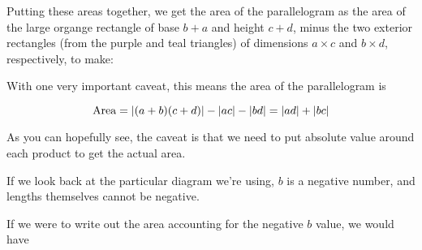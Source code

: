 \documentclass{ximera}
\begin{document}
\begin{example}
\begin{explanation}
      Putting these areas together, we get the area of the parallelogram as the area of the large organge rectangle of base $b+a$ and height $c+d$, minus the two exterior rectangles (from the purple and teal triangles) of dimensions $a\times c$ and $b\times d$, respectively, to make:

      \begin{center}
        \end{center}

      With one very important caveat, this means the area of the parallelogram is 

      $$\text{Area}=\left|(a+b)(c+d)\right|-\left|ac\right|-\left|bd\right|=\left|ad\right|+\left|bc\right|$$

      As you can hopefully see, the caveat is that we need to put absolute value around each product to get the actual area. 

      If we look back at the particular diagram we're using, $b$ is a negative number, and lengths themselves cannot be negative. 

      If we were to write out the area accounting for the negative $b$ value, we would have


\end{explanation}
\end{example}
\end{document}

